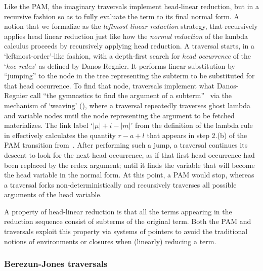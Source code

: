 \documentclass[xchauthor,chkrefs,GCNS,amsmath,amsthm,rotating,leaveRGB]{tcsg}
\theoremstyle{plain}
\theoremstyle{definition}
\begin{document}
Like the PAM, the imaginary traversals implement head-linear reduction, but
in a recursive fashion so as to fully evaluate the term to its final normal
form. A notion that we formalize as the \emph{leftmost linear reduction}
strategy, that recursively applies head linear reduction just like how the
\emph{normal reduction} of the lambda calculus proceeds by recursively
applying head reduction. A traversal starts, in a `leftmost-order'-like
fashion, with a depth-first search for \emph{head occurrence} of the
`\emph{hoc redex}' as defined by Danos-Regnier. It performs linear
substitution by ``jumping'' to the node in the tree representing the subterm
to be substituted for that head occurrence. To find that node, traversals
implement what Danos-Regnier call ``the gymnastics to find the argument of a
subterm''~\cite{danos-head} via the mechanism of `weaving'
(), where a traversal repeatedly
traverses ghost lambda and variable nodes until the node representing the
argument to be fetched materializes. The link label `$|\mu |+i-|m|$' from the
definition of the lambda rule in 
effectively calculates the quantity $r-a+l$ that appears in step 2.(b) of the
PAM transition from~\cite{danos-head}. After performing such a jump, a
traversal continues its descent to look for the next head occurrence, as if
that first head occurrence had been replaced by the redex argument; until it
finds the variable that will become the head variable in the normal form. At
this point, a PAM would stop, whereas a traversal forks
non-deterministically and recursively traverses all possible arguments of the
head variable.

A property of head-linear reduction is that all the terms appearing in the
reduction sequence consist of subterms of the original term. Both the PAM
and traversals exploit this property via systems of pointers to avoid the
traditional notions of environments or closures when (linearly) reducing a
term.

\subsubsection{Berezun-Jones traversals}\label{sec1.3.3}
\end{document}
